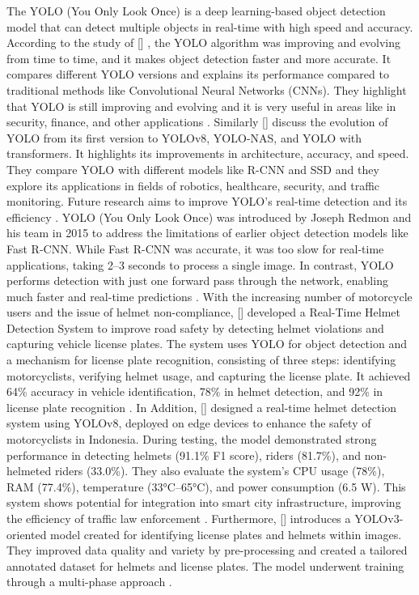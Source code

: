 \begin{refsection}
The YOLO (You Only Look Once) is a deep learning-based object detection model that can detect multiple objects in real-time with high speed and accuracy. According to the study of \citeauthor{jiang2022review} [\citeyear{jiang2022review}] , the YOLO algorithm was improving and evolving from time to time, and it makes object detection faster and more accurate. It compares different YOLO versions and explains its performance compared to traditional methods like Convolutional Neural Networks (CNNs). They highlight that YOLO is still improving and evolving and it is very useful in areas like in security, finance, and other applications \cite{jiang2022review}. Similarly \citeauthor{terven2022comprehensive} [\citeyear{terven2022comprehensive}] discuss the evolution of YOLO from its first version to YOLOv8, YOLO-NAS, and YOLO with transformers. It highlights its improvements in architecture, accuracy, and speed. They compare YOLO with different models like R-CNN and SSD and they explore its applications in fields of robotics, healthcare, security, and traffic monitoring. Future research aims to improve YOLO’s real-time detection and its efficiency \cite{terven2022comprehensive}. YOLO (You Only Look Once) was introduced by Joseph Redmon and his team in 2015 to address the limitations of earlier object detection models like Fast R-CNN. While Fast R-CNN was accurate, it was too slow for real-time applications, taking 2–3 seconds to process a single image. In contrast, YOLO performs detection with just one forward pass through the network, enabling much faster and real-time predictions \cite{gfg2021yolo}.
With the increasing number of motorcycle users and the issue of helmet non-compliance, \citeauthor{kumar2024realtime}[\citeyear{kumar2024realtime}] developed a Real-Time Helmet Detection System to improve road safety by detecting helmet violations and capturing vehicle license plates. The system uses YOLO for object detection and a mechanism for license plate recognition, consisting of three steps: identifying motorcyclists, verifying helmet usage, and capturing the license plate. It achieved 64\% accuracy in vehicle identification, 78\% in helmet detection, and 92\% in license plate recognition \cite{kumar2024realtime}. In Addition, \citeauthor{muhammad2024helmet} [\citeyear{muhammad2024helmet}] designed a real-time helmet detection system using YOLOv8, deployed on edge devices to enhance the safety of motorcyclists in Indonesia. During testing, the model demonstrated strong performance in detecting helmets (91.1\% F1 score), riders (81.7\%), and non-helmeted riders (33.0\%). They also evaluate the system’s CPU usage (78\%), RAM (77.4\%), temperature (33°C–65°C), and power consumption (6.5 W). This system shows potential for integration into smart city infrastructure, improving the efficiency of traffic law enforcement \cite {muhammad2024helmet}. Furthermore,\citeauthor{choubey2025helmet} [\citeyear{choubey2025helmet}] introduces a YOLOv3-oriented model created for identifying license plates and helmets within images. They improved data quality and variety by pre-processing and created a tailored annotated dataset for helmets and license plates. The model underwent training through a multi-phase approach \cite{choubey2025helmet}.



\end{refsection}
